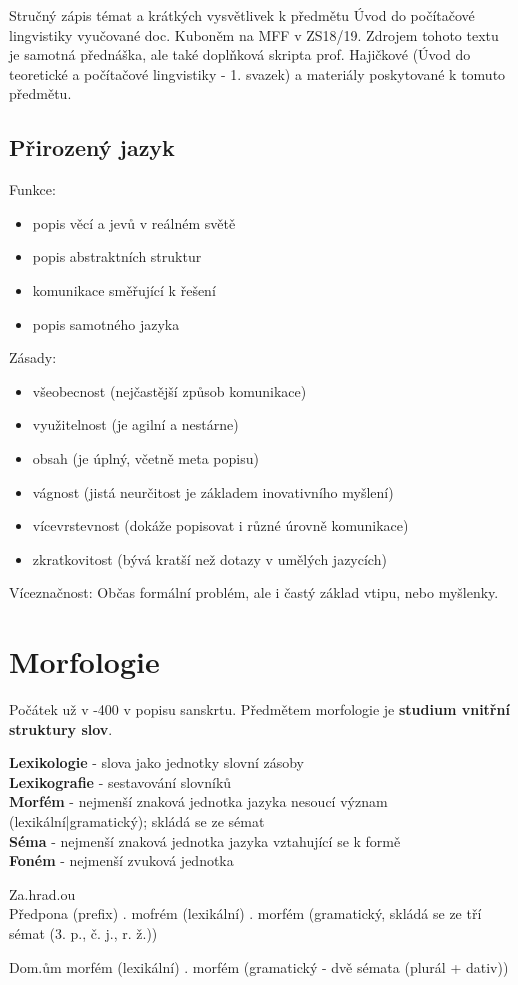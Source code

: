 \documentclass[a4paper]{article}
\newcommand{\imwb}[2]{\textbf{#1} - #2 \\}
\newcommand{\ims}[1]{\textbf{#1}}
\begin{document}
\thispagestyle{fancy} %
{}

Stručný zápis témat a krátkých vysvětlivek k předmětu Úvod do počítačové lingvistiky vyučované doc. Kuboněm na MFF v ZS18/19. Zdrojem tohoto textu je samotná přednáška, ale také doplňková skripta prof. Hajičkové (Úvod do teoretické a počítačové lingvistiky - 1. svazek) a materiály poskytované k tomuto předmětu.

\subsection*{Přirozený jazyk}
Funkce:
\begin{itemize}
\item popis věcí a jevů v reálném světě
\item popis abstraktních struktur
\item komunikace směřující k řešení
\item popis samotného jazyka
\end{itemize}

Zásady:
\begin{itemize}
\item všeobecnost (nejčastější způsob komunikace)
\item využitelnost (je agilní a nestárne)
\item obsah (je úplný, včetně meta popisu)
\item vágnost (jistá neurčitost je základem inovativního myšlení)
\item vícevrstevnost (dokáže popisovat i různé úrovně komunikace)
\item zkratkovitost (bývá kratší než dotazy v umělých jazycích)
\end{itemize}

Víceznačnost:
Občas formální problém, ale i častý základ vtipu, nebo myšlenky.
\pagebreak
\section*{Morfologie}
Počátek už v -400 v popisu sanskrtu. Předmětem morfologie je \ims{studium vnitřní struktury slov}.

\imwb{Lexikologie}{slova jako jednotky slovní zásoby}
\imwb{Lexikografie}{sestavování slovníků}
\imwb{Morfém}{nejmenší znaková jednotka jazyka nesoucí význam (lexikální|gramatický); skládá se ze sémat}
\imwb{Séma}{nejmenší znaková jednotka jazyka vztahující se k formě}
\imwb{Foném}{nejmenší zvuková jednotka}
\begin{center}
Za.hrad.ou \\
Předpona (prefix) . mofrém (lexikální) . morfém (gramatický, skládá se ze tří sémat (3. p., č. j., r. ž.))
\end{center}
\begin{center}
Dom.ům
morfém (lexikální) . morfém (gramatický - dvě sémata (plurál + dativ))
\end{center}
\end{document}

